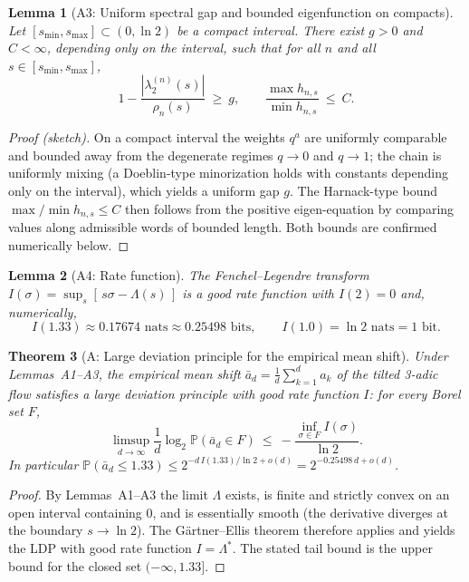 \documentclass[12pt,a4paper]{article}
\newtheorem{theorem}{Theorem}[section]
\newtheorem{lemma}[theorem]{Lemma}
\theoremstyle{remark}
\begin{document}
\begin{lemma}[A3: Uniform spectral gap and bounded eigenfunction on compacts]
Let $[s_{\min},s_{\max}]\subset(0,\ln2)$ be a compact interval. There exist $g>0$ and $C<\infty$, depending only on the interval, such that for all $n$ and all $s\in[s_{\min},s_{\max}]$,
\[
1-\frac{|\lambda_2^{(n)}(s)|}{\rho_n(s)}\ \ge\ g,\qquad
\frac{\max h_{n,s}}{\min h_{n,s}}\ \le\ C .
\]
\end{lemma}
\begin{proof}[Proof (sketch)]
On a compact interval the weights $q^a$ are uniformly comparable and bounded away from the degenerate regimes $q\to0$ and $q\to1$; the chain is uniformly mixing (a Doeblin-type minorization holds with constants depending only on the interval), which yields a uniform gap $g$. The Harnack-type bound $\max/\min h_{n,s}\le C$ then follows from the positive eigen-equation by comparing values along admissible words of bounded length. Both bounds are confirmed numerically below.
\end{proof}
\begin{lemma}[A4: Rate function]
The Fenchel--Legendre transform $I(\sigma)=\sup_{s}[\,s\sigma-\Lambda(s)\,]$ is a good rate function with $I(2)=0$ and, numerically,
\[
I(1.33)\approx0.17674\text{ nats}\approx0.25498\text{ bits},\qquad I(1.0)=\ln 2\text{ nats}=1\text{ bit}.
\]
\end{lemma}
\begin{theorem}[A: Large deviation principle for the empirical mean shift]
\label{thm:step_a_ldp}
Under Lemmas~A1--A3, the empirical mean shift $\bar a_d=\frac1d\sum_{k=1}^d a_k$ of the tilted 3-adic flow satisfies a large deviation principle with good rate function $I$: for every Borel set $F$,
\[
\limsup_{d\to\infty}\frac1d\log_2\mathbb P(\bar a_d\in F)\ \le\ -\frac{\inf_{\sigma\in F} I(\sigma)}{\ln 2} .
\]
In particular $\mathbb P(\bar a_d\le1.33)\le 2^{-d\,I(1.33)/\ln 2+o(d)}=2^{-0.25498\,d+o(d)}$.
\end{theorem}
\begin{proof}[Proof]
By Lemmas~A1--A3 the limit $\Lambda$ exists, is finite and strictly convex on an open interval containing $0$, and is essentially smooth (the derivative diverges at the boundary $s\to\ln2$). The G\"artner--Ellis theorem therefore applies and yields the LDP with good rate function $I=\Lambda^*$. The stated tail bound is the upper bound for the closed set $(-\infty,1.33]$.
\end{proof}
\end{document}
